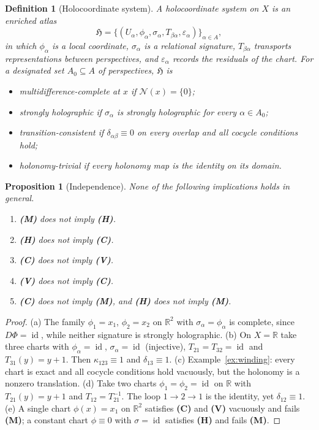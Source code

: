 \documentclass[11pt]{article}
\newtheorem{definition}{Definition}
\newtheorem{proposition}{Proposition}
\theoremstyle{remark}
\newcommand{\R}{\mathbb{R}}
\newcommand{\N}{\mathcal{N}}
\newcommand{\id}{\operatorname{id}}
\begin{document}
\begin{definition}[Holocoordinate system]
A \emph{holocoordinate system} on $X$ is an enriched atlas
\[
\mathfrak H=\bigl\{(U_\alpha,\phi_\alpha,\sigma_\alpha,T_{\beta\alpha},\varepsilon_\alpha)\bigr\}_{\alpha\in A},
\]
in which $\phi_\alpha$ is a local coordinate, $\sigma_\alpha$ is a relational signature, $T_{\beta\alpha}$ transports representations between perspectives, and $\varepsilon_\alpha$ records the residuals of the chart. For a designated set $A_0\subseteq A$ of perspectives, $\mathfrak H$ is
\begin{itemize}[nosep]
\item[\textbf{(M)}] \emph{multidifference-complete at $x$} if $\N(x)=\{0\}$;
\item[\textbf{(H)}] \emph{strongly holographic} if $\sigma_\alpha$ is strongly holographic for every $\alpha\in A_0$;
\item[\textbf{(C)}] \emph{transition-consistent} if $\delta_{\alpha\beta}\equiv0$ on every overlap and all cocycle conditions hold;
\item[\textbf{(V)}] \emph{holonomy-trivial} if every holonomy map is the identity on its domain.
\end{itemize}
\end{definition}

\begin{proposition}[Independence]
None of the following implications holds in general.
\begin{enumerate}[label=(\alph*),nosep]
\item \textbf{(M)} does not imply \textbf{(H)}.
\item \textbf{(H)} does not imply \textbf{(C)}.
\item \textbf{(C)} does not imply \textbf{(V)}.
\item \textbf{(V)} does not imply \textbf{(C)}.
\item \textbf{(C)} does not imply \textbf{(M)}, and \textbf{(H)} does not imply \textbf{(M)}.
\end{enumerate}
\end{proposition}

\begin{proof}
(a) The family $\phi_1=x_1$, $\phi_2=x_2$ on $\R^2$ with $\sigma_\alpha=\phi_\alpha$ is complete, since $D\Phi=\id$, while neither signature is strongly holographic. (b) On $X=\R$ take three charts with $\phi_\alpha=\id$, $\sigma_\alpha=\id$ (injective), $T_{21}=T_{32}=\id$ and $T_{31}(y)=y+1$. Then $\kappa_{123}\equiv1$ and $\delta_{13}\equiv1$. (c) Example~\ref{ex:winding}: every chart is exact and all cocycle conditions hold vacuously, but the holonomy is a nonzero translation. (d) Take two charts $\phi_1=\phi_2=\id$ on $\R$ with $T_{21}(y)=y+1$ and $T_{12}=T_{21}^{-1}$. The loop $1\to2\to1$ is the identity, yet $\delta_{12}\equiv1$. (e) A single chart $\phi(x)=x_1$ on $\R^2$ satisfies \textbf{(C)} and \textbf{(V)} vacuously and fails \textbf{(M)}; a constant chart $\phi\equiv0$ with $\sigma=\id$ satisfies \textbf{(H)} and fails \textbf{(M)}.
\end{proof}
\end{document}
